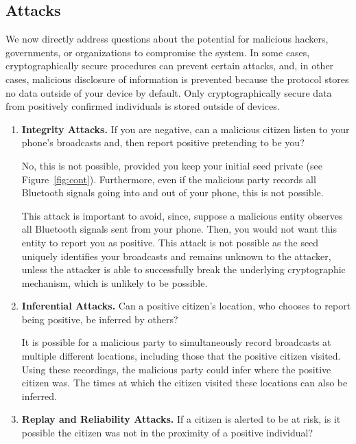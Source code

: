 \subsection{Attacks}

 We now directly address questions about the potential for malicious hackers, governments, or organizations to compromise the system. In some cases, cryptographically secure procedures can prevent certain attacks, and, in other cases, malicious disclosure of information is prevented because the protocol stores no data outside of your device by default. Only cryptographically secure data from positively confirmed individuals is  stored outside of devices.

\begin{enumerate}[leftmargin=*]

\item \textbf{Integrity Attacks.} If you are negative, can a malicious citizen listen to your phone's broadcasts and, then report positive pretending to be you? 

   No, this is not possible, provided you keep your initial seed private (see Figure~\ref{fig:cont}). Furthermore, even if the malicious party records all Bluetooth signals going into and out of your phone, this is not possible.
   
   This attack is important to avoid, since, suppose a malicious entity observes all Bluetooth signals sent from your phone. Then, you would not want this entity to report you as positive. This attack is not possible as the seed uniquely identifies your broadcasts and remains unknown to the attacker, unless the attacker is able to successfully break the underlying cryptographic mechanism, which is unlikely to be possible. 
   
 

  \item \textbf{Inferential Attacks.} Can a positive citizen's location, who chooses to report being positive, be inferred by others?
  
    It is possible for a malicious party to simultaneously record broadcasts at multiple different locations, including those that the positive citizen visited. Using these recordings, the malicious party could infer where the  positive citizen was. The times at which the citizen visited these locations can also be inferred. 
  



    \item \textbf{Replay and Reliability Attacks.}  If a citizen is alerted to be at risk, is it possible the citizen was not in the proximity of a positive individual?  
    

\end{enumerate}
